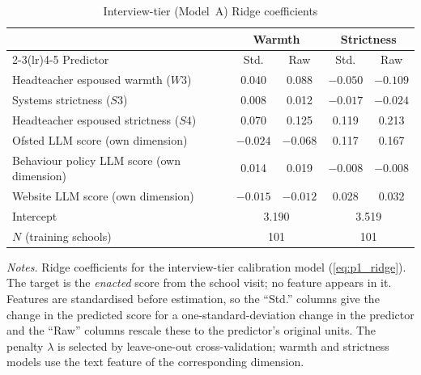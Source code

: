 \begin{table}[htbp]\centering\caption{Interview-tier (Model~A) Ridge coefficients}
\label{tab:interview_model_coefs}

\footnotesize\setlength{\tabcolsep}{4pt}%
\begin{tabular}{lcccc}
\toprule
                    & \multicolumn{2}{c}{Warmth} & \multicolumn{2}{c}{Strictness} \\
\cmidrule(lr){2-3}\cmidrule(lr){4-5}
Predictor           & Std. & Raw & Std. & Raw \\
\midrule
Headteacher espoused warmth ($W3$)         & 0.040 & 0.088 & $-0.050$ & $-0.109$ \\
Systems strictness ($S3$)                  & 0.008 & 0.012 & $-0.017$ & $-0.024$ \\
Headteacher espoused strictness ($S4$)     & 0.070 & 0.125 & 0.119 & 0.213 \\
Ofsted LLM score (own dimension)           & $-0.024$ & $-0.068$ & 0.117 & 0.167 \\
Behaviour policy LLM score (own dimension) & 0.014 & 0.019 & $-0.008$ & $-0.008$ \\
Website LLM score (own dimension)          & $-0.015$ & $-0.012$ & 0.028 & 0.032 \\
\midrule
Intercept & \multicolumn{2}{c}{3.190} & \multicolumn{2}{c}{3.519} \\
$N$ (training schools) & \multicolumn{2}{c}{101} & \multicolumn{2}{c}{101} \\
\bottomrule
\end{tabular}
\begin{minipage}{\textwidth}\vspace{0.5em}\footnotesize
\textit{Notes.} Ridge coefficients for the interview-tier calibration model (\cref{eq:p1_ridge}). The target is the \emph{enacted} score from the school visit; no feature appears in it. Features are standardised before estimation, so the ``Std.'' columns give the change in the predicted score for a one-standard-deviation change in the predictor and the ``Raw'' columns rescale these to the predictor's original units. The penalty $\lambda$ is selected by leave-one-out cross-validation; warmth and strictness models use the text feature of the corresponding dimension.
\end{minipage}
\end{table}